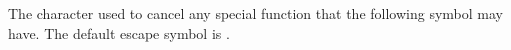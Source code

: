 \item[Escape character]{
The character used to cancel any special function
that the following symbol may have.  
The default escape symbol is \bxshell{$\backslash$}.
}